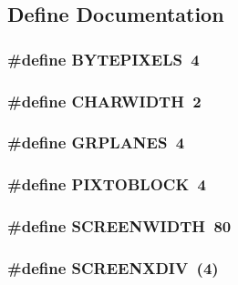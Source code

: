 \subsection{Define Documentation}
\hypertarget{ID__VH_8C_abd49a133c95c9a4c33ea013463d74f7a}{
\subsubsection[{BYTEPIXELS}]{\setlength{\rightskip}{0pt plus 5cm}\#define BYTEPIXELS~4}}
\label{ID__VH_8C_abd49a133c95c9a4c33ea013463d74f7a}
\hypertarget{ID__VH_8C_a45952f78a0f44bd0ac30cd6d49631262}{
\subsubsection[{CHARWIDTH}]{\setlength{\rightskip}{0pt plus 5cm}\#define CHARWIDTH~2}}
\label{ID__VH_8C_a45952f78a0f44bd0ac30cd6d49631262}
\hypertarget{ID__VH_8C_af943e6c0f4b6d09ce583aad1c8540ef5}{
\subsubsection[{GRPLANES}]{\setlength{\rightskip}{0pt plus 5cm}\#define GRPLANES~4}}
\label{ID__VH_8C_af943e6c0f4b6d09ce583aad1c8540ef5}
\hypertarget{ID__VH_8C_a8f558f8f0da9ae8d6732a1a56a23a80f}{
\subsubsection[{PIXTOBLOCK}]{\setlength{\rightskip}{0pt plus 5cm}\#define PIXTOBLOCK~4}}
\label{ID__VH_8C_a8f558f8f0da9ae8d6732a1a56a23a80f}
\hypertarget{ID__VH_8C_ada0cc738d27aad251151e69cb8d250e1}{
\subsubsection[{SCREENWIDTH}]{\setlength{\rightskip}{0pt plus 5cm}\#define SCREENWIDTH~80}}
\label{ID__VH_8C_ada0cc738d27aad251151e69cb8d250e1}
\hypertarget{ID__VH_8C_aa1b8de7475655a403b628049e6007d41}{
\subsubsection[{SCREENXDIV}]{\setlength{\rightskip}{0pt plus 5cm}\#define SCREENXDIV~(4)}}
